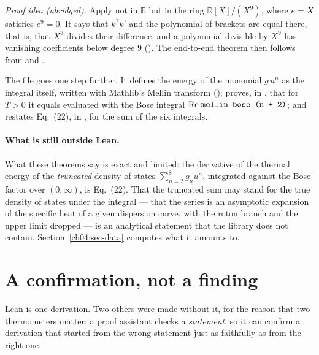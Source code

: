 \emph{Proof idea (abridged).} Apply  not in $\mathbb R$ but in the ring $\mathbb R[X]/(X^9)$, where $e=X$ satisfies $e^9=0$.
It says that $k^2k'$ and the polynomial of brackets are equal there, that is, that $X^9$ divides their difference, and a polynomial divisible by $X^9$ has vanishing coefficients below degree $9$ ().
The end-to-end theorem then follows from  and .

The file goes one step further.
It defines the energy of the monomial $g\,u^n$ as the integral itself, written with Mathlib's Mellin transform (); proves, in , that for $T>0$ it equals  evaluated with the Bose integral $\operatorname{Re}\,\texttt{mellin bose (n + 2)}$; and restates Eq.~(22), in , for the sum of the six integrals.


\paragraph{What is still outside Lean.}
What these theorems say is exact and limited: the derivative of the thermal energy of the \emph{truncated} density of states $\sum_{n=2}^{8}g_nu^n$, integrated against the Bose factor over $(0,\infty)$, is Eq.~(22).
That the truncated sum may stand for the true density of states under the integral --- that the series is an asymptotic expansion of the specific heat of a given dispersion curve, with the roton branch and the upper limit dropped --- is an analytical statement that the library does not contain.
Section~\ref{ch04:sec-data} computes what it amounts to.



\section{A confirmation, not a finding}\label{ch04:sec-confirm}

Lean is one derivation.
Two others were made without it, for the reason that two thermometers matter: a proof assistant checks a \emph{statement}, so it can confirm a derivation that started from the wrong statement just as faithfully as from the right one.

